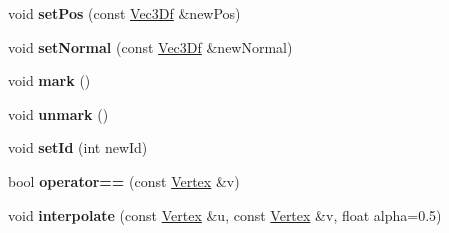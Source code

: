 \begin{DoxyCompactItemize}
\item 
\hypertarget{class_vertex_a2e70cf74099095e6dcbf1cb0b6c36a60}{
void {\bfseries setPos} (const \hyperlink{class_vec3_d}{Vec3Df} \&newPos)}
\label{class_vertex_a2e70cf74099095e6dcbf1cb0b6c36a60}

\item 
\hypertarget{class_vertex_a8a7525b1dbd634e704d298cb4b49a6e8}{
void {\bfseries setNormal} (const \hyperlink{class_vec3_d}{Vec3Df} \&newNormal)}
\label{class_vertex_a8a7525b1dbd634e704d298cb4b49a6e8}

\item 
\hypertarget{class_vertex_a35c96268d32fe84af664a2d3beb0c6ca}{
void {\bfseries mark} ()}
\label{class_vertex_a35c96268d32fe84af664a2d3beb0c6ca}

\item 
\hypertarget{class_vertex_a0b8c2a69595f86592e9538386d82125b}{
void {\bfseries unmark} ()}
\label{class_vertex_a0b8c2a69595f86592e9538386d82125b}

\item 
\hypertarget{class_vertex_a022e5d3151c7525ca5663b9fcd62ea52}{
void {\bfseries setId} (int newId)}
\label{class_vertex_a022e5d3151c7525ca5663b9fcd62ea52}

\item 
\hypertarget{class_vertex_a50c7b9747e7c6eb761d0559dbfd9847d}{
bool {\bfseries operator==} (const \hyperlink{class_vertex}{Vertex} \&v)}
\label{class_vertex_a50c7b9747e7c6eb761d0559dbfd9847d}

\item 
\hypertarget{class_vertex_ac00a06d538fca792d8aa14b559ed21b0}{
void {\bfseries interpolate} (const \hyperlink{class_vertex}{Vertex} \&u, const \hyperlink{class_vertex}{Vertex} \&v, float alpha=0.5)}
\label{class_vertex_ac00a06d538fca792d8aa14b559ed21b0}

\end{DoxyCompactItemize}
